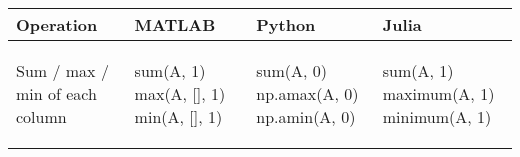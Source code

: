 \documentclass[10pt, landscape]{article}
\newenvironment{Shaded}{}{}
\newcommand{\DecValTok}[1]{\textcolor[rgb]{0.25,0.63,0.44}{{#1}}}
\newcommand{\FloatTok}[1]{\textcolor[rgb]{0.25,0.63,0.44}{{#1}}}
\newcommand{\BuiltInTok}[1]{{#1}}
\newcommand{\NormalTok}[1]{{#1}}
\begin{document}
\begin{multicols*}{2}
\begin{table}[ht]
\begin{tabular}[ ]{@{}llll@{}}
\toprule
\begin{minipage}[b]{0.23\columnwidth}\raggedright\strut
Operation\strut
\end{minipage} & \begin{minipage}[b]{0.22\columnwidth}\raggedright\strut
MATLAB\strut
\end{minipage} & \begin{minipage}[b]{0.24\columnwidth}\raggedright\strut
Python\strut
\end{minipage} & \begin{minipage}[b]{0.20\columnwidth}\raggedright\strut
Julia\strut
\end{minipage}\tabularnewline
\midrule
\begin{minipage}[t]{0.23\columnwidth}\raggedright\strut
Sum / max / min of each column\strut
\end{minipage} & \begin{minipage}[t]{0.22\columnwidth}\raggedright\strut
\begin{Shaded}
\begin{Highlighting}[]
\NormalTok{sum(A, }\FloatTok{1}\NormalTok{)}
\NormalTok{max(A, [], }\FloatTok{1}\NormalTok{)}
\NormalTok{min(A, [], }\FloatTok{1}\NormalTok{)}
\end{Highlighting}
\end{Shaded}
\strut
\end{minipage} & \begin{minipage}[t]{0.24\columnwidth}\raggedright\strut
\begin{Shaded}
\begin{Highlighting}[]
\BuiltInTok{sum}\NormalTok{(A, }\DecValTok{0}\NormalTok{)}
\NormalTok{np.amax(A, }\DecValTok{0}\NormalTok{)}
\NormalTok{np.amin(A, }\DecValTok{0}\NormalTok{)}
\end{Highlighting}
\end{Shaded}
\strut
\end{minipage} & \begin{minipage}[t]{0.20\columnwidth}\raggedright\strut
\begin{Shaded}
\begin{Highlighting}[]
\NormalTok{sum(A, }\FloatTok{1}\NormalTok{)}
\NormalTok{maximum(A, }\FloatTok{1}\NormalTok{)}
\NormalTok{minimum(A, }\FloatTok{1}\NormalTok{)}
\end{Highlighting}
\end{Shaded}
\strut
\end{minipage}\tabularnewline

\end{tabular}
\end{table}
\end{multicols*}
\end{document}
